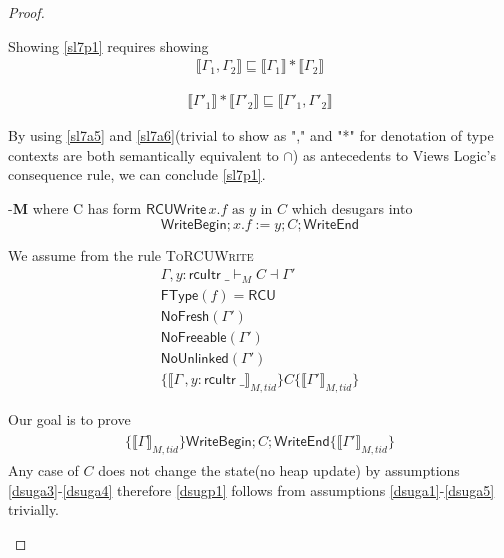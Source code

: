 \begin{proof}
\begin{case}
Showing \ref{sl7p1} requires showing 
\begin{gather}\label{sl7a5}
\llbracket \Gamma_1,\Gamma_2 \rrbracket \sqsubseteq \llbracket \Gamma_1\rrbracket * \llbracket  \Gamma_2 \rrbracket
\end{gather}

\begin{gather}\label{sl7a6}
\llbracket \Gamma'_1 \rrbracket * \llbracket \Gamma'_2 \rrbracket \sqsubseteq \llbracket \Gamma'_1, \Gamma'_2 \rrbracket
\end{gather}

By using \ref{sl7a5} and \ref{sl7a6}(trivial to show as "," and "*" for denotation of type contexts are both semantically equivalent to $\cap$) as antecedents to Views Logic's consequence rule, we can conclude \ref{sl7p1}.
\end{case}
\begin{case}-\textbf{M} where C has form $\textsf{RCUWrite}\, x.f \text{ as } y \text{ in } C$
  which desugars into
  \[\textsf{WriteBegin}; x.f:= y ; C ;\textsf{WriteEnd}\]

  We assume from the rule \textsc{ToRCUWrite}
 \begin{gather}\label{dsuga1}
       \Gamma, y:\textsf{rcuItr}\;\_ \vdash_{M} C \dashv \Gamma' \\
       \label{dsuga2}
       \textsf{FType}(f) = \textsf{RCU} \\
       \label{dsuga3}
       \textsf{NoFresh}(\Gamma') \\
       \label{dsugaes}
       \textsf{NoFreeable}(\Gamma')\\
       \label{dsuga4}
       \textsf{NoUnlinked}(\Gamma')\\
        \label{dsuga5}
       \{\llbracket \Gamma\,, y:\textsf{rcuItr}\;\_ \rrbracket_{M,tid} \}  C \{\llbracket \Gamma' \rrbracket_{M,tid}\}
      \end{gather}
      
    Our goal is to prove
    \begin{gather}\label{dsugp1}
      \begin{array}{l}
      \{\llbracket \Gamma \rrbracket_{M,tid} \} 
      \textsf{WriteBegin}; C ;\textsf{WriteEnd}
      \{\llbracket \Gamma' \rrbracket_{M,tid} \}
      \end{array}
    \end{gather}
Any case of $C$ does not change the state(no heap update) by assumptions \ref{dsuga3}-\ref{dsuga4} therefore \ref{dsugp1} follows from assumptions \ref{dsuga1}-\ref{dsuga5} trivially.
\end{case}
\end{proof}
